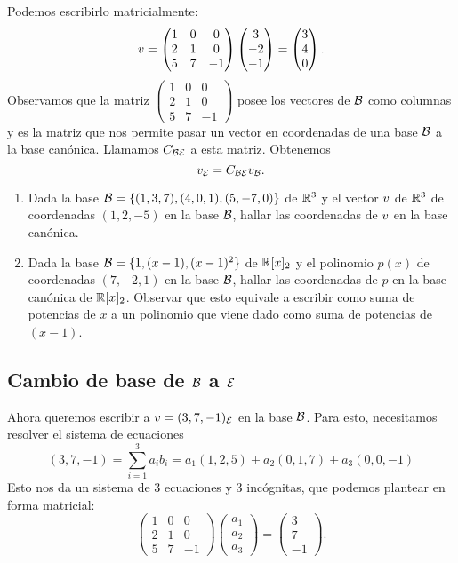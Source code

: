 Podemos escribirlo matricialmente:
$$
\vb = \begin{pmatrix}
1 & 0 & 0 \\
2 & 1 & 0 \\
5 & 7 & -1\end{pmatrix} \begin{pmatrix} 3 \\ -2 \\ -1 \end{pmatrix} =  \begin{pmatrix} 3 \\ 4 \\ 0 \end{pmatrix}.
$$
Observamos que la matriz $\begin{pmatrix} 1 & 0 & 0 \\ 2 & 1 & 0 \\ 5 & 7 & -1 \end{pmatrix}$ posee los vectores de $\mathcal B$ como columnas y es la matriz que nos permite pasar un vector en coordenadas de una base $\mathcal B$ a la base canónica. Llamamos $\Cb_{\B\E}$ a esta matriz. Obtenemos
$$
\vb_\E= \Cb_{\B\E} \vb_\B.
$$

\begin{ejercicio}\leavevmode
\begin{enumerate}
 \item Dada la base $\mathcal B = \{(1,3,7), (4, 0, 1), (5, -7, 0)\}$ de $\mathbb R^3$ y el vector $\vb$ de $\mathbb R^3$ de coordenadas $(1,2,-5)$ en la base $\mathcal B$, hallar las coordenadas de $\vb$ en la base canónica.
\item Dada la base $\mathcal B = \{1, (x-1), (x-1)^2\}$ de $\mathbb R[x]_2$ y el polinomio $p(x)$ de coordenadas $(7, -2, 1)$ en la base $\mathcal B$, hallar las coordenadas de $p$ en la base canónica de $\mathbb R[x]_2$. Observar que esto equivale a escribir como suma de potencias de $x$ a un polinomio que viene dado como suma de potencias de $(x-1)$.
\end{enumerate}
\end{ejercicio}

\subsection{Cambio de base de $\mathcal B$ a $\mathcal E$}

Ahora queremos escribir a $\vb = (3,7, -1)_\E$ en la base $\mathcal B$. Para esto, necesitamos resolver el sistema de ecuaciones $$
(3, 7, -1) = \sum_{i=1}^{3} a_i b_i = a_1 (1,2,5) + a_2 (0, 1, 7) + a_3 (0,0,-1)
$$ Esto nos da un sistema de 3 ecuaciones y 3 incógnitas, que podemos plantear en forma matricial:
$$
\begin{pmatrix}
1 & 0 & 0 \\
2 & 1 & 0 \\
5 & 7 & -1
\end{pmatrix} \begin{pmatrix} a_1 \\ a_2 \\a_3 \end{pmatrix}  = \begin{pmatrix} 3 \\ 7 \\ -1 \end{pmatrix}.
$$

